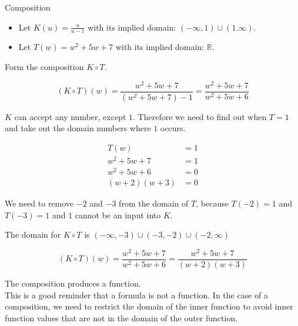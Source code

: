 \documentclass{ximera}
\begin{document}
\begin{example} Composition


\begin{itemize}
\item Let $K(u) = \frac{u}{u-1}$ with its implied domain: $(-\infty, 1) \cup (1. \infty)$. \\

\item Let $T(w) = w^2 + 5w + 7$ with its implied domain: \textbf{$\mathbb{R}$}.
\end{itemize}


Form the composition $K \circ T$.

\[        (K \circ T)(w) =     \frac{w^2 + 5w + 7}{(w^2 + 5w + 7)-1}   =    \frac{w^2 + 5w + 7}{w^2 + 5w + 6}  \]


$K$ can accept any number, except $1$.  Therefore we need to find out when $T = 1$ and take out the domain numbers where $1$ occurs.



\begin{align*}
T(w) & = 1   \\
w^2 + 5w + 7 & = 1 \\
w^2 + 5w + 6 & = 0   \\
(w+2)(w+3) & = 0
\end{align*}


We need to remove $-2$ and $-3$ from the domain of $T$, because $T(-2)=1$ and $T(-3)=1$ and $1$ cannot be an input into $K$.


The domain for $K \circ T$ is $(-\infty, -3) \cup (-3, -2) \cup (-2, \infty)$




\[        (K \circ T)(w)  =    \frac{w^2 + 5w + 7}{w^2 + 5w + 6}  =    \frac{w^2 + 5w + 7}{(w+2)(w+3)} \]










The composition produces a function. \\


This is a good reminder that a formula is not a function.  In the case of a composition, we need to restrict the domain of the inner function to avoid inner function values that are not in the domain of the outer function.










\end{example}
\end{document}
